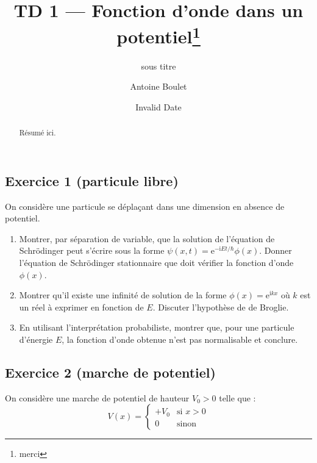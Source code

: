 \documentclass[
  french,
  12pt,
]{article}
\title{TD 1 --- Fonction d'onde dans un potentiel\thanks{merci}}
\subtitle{sous titre}
\author{Antoine Boulet}
\date{Invalid Date}
\providecommand{\tightlist}{%
  \setlength{\itemsep}{0pt}\setlength{\parskip}{0pt}}
\begin{document}
\maketitle
\begin{abstract}
Résumé ici.
\end{abstract}


\subsection{Exercice 1 (particule
libre)}\label{exercice-1-particule-libre}

On considère une particule se déplaçant dans une dimension en absence de
potentiel.

\begin{enumerate}
\def\labelenumi{\alph{enumi}.}
\tightlist
\item
  Montrer, par séparation de variable, que la solution de l'équation de
  Schrödinger peut s'écrire sous la forme
  \(\psi(x,t) = \mathrm{e}^{-\mathrm{i}Et/\hbar}\phi(x)\). Donner
  l'équation de Schrödinger stationnaire que doit vérifier la fonction
  d'onde \(\phi(x)\).
\item
  Montrer qu'il existe une infinité de solution de la forme
  \(\phi(x) = \mathrm{e}^{\mathrm{i}kx}\) où \(k\) est un réel à
  exprimer en fonction de \(E\). Discuter l'hypothèse de de Broglie.
\item
  En utilisant l'interprétation probabiliste, montrer que, pour une
  particule d'énergie \(E\), la fonction d'onde obtenue n'est pas
  normalisable et conclure.
\end{enumerate}

\subsection{Exercice 2 (marche de
potentiel)}\label{exercice-2-marche-de-potentiel}

On considère une marche de potentiel de hauteur \(V_0>0\) telle que :
\begin{equation}
    V(x) = \begin{cases}
        +V_0 & \text{si~} x > 0
        \\
        0 & \text{sinon}
    \end{cases}
\end{equation}

\marginnote{\begin{footnotesize}

\end{footnotesize}}
\end{document}
